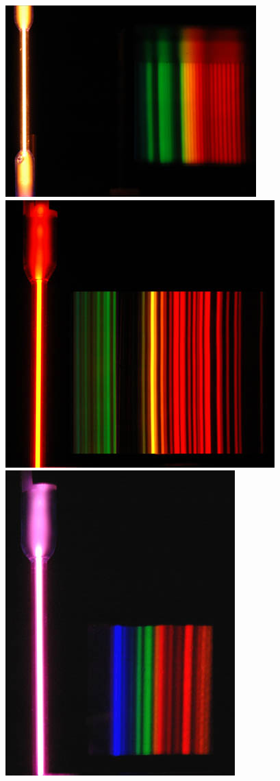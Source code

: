 \documentclass[11pt]{article}
\makeatletter
\def\maxwidth{\ifdim\Gin@nat@width>\linewidth\linewidth
    \else\Gin@nat@width\fi}
\let\Oldincludegraphics\includegraphics
\renewcommand{\includegraphics}[1]{\Oldincludegraphics[width=.8\maxwidth]{#1}}
\makeatother
\begin{document}
\includegraphics{standardNitrogen.jpg} \\

\includegraphics{standardNeon.jpg} \\

\includegraphics{standardArgon.jpg}
\end{document}
